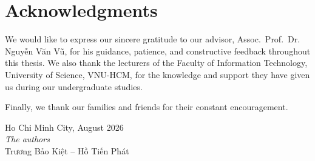 \chapter*{Acknowledgments}

We would like to express our sincere gratitude to our advisor, Assoc.~Prof.~Dr.
Nguyễn Văn Vũ, for his guidance, patience, and constructive feedback throughout
this thesis. We also thank the lecturers of the Faculty of Information
Technology, University of Science, VNU-HCM, for the knowledge and support they
have given us during our undergraduate studies.

Finally, we thank our families and friends for their constant encouragement.

\begin{flushright}
Ho Chi Minh City, August 2026\\
\textit{The authors}\\
Trương Bảo Kiệt -- Hồ Tiến Phát
\end{flushright}
